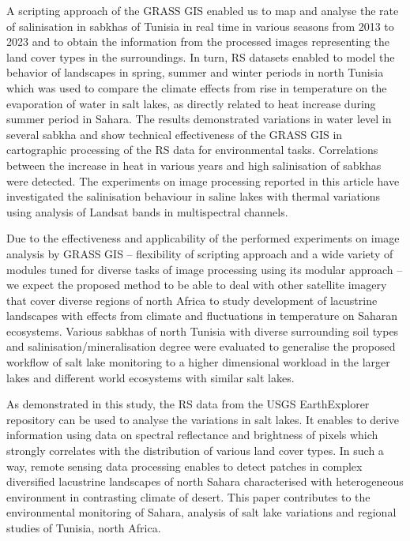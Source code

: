 \documentclass[environments,article,submit,pdftex,moreauthors]{Definitions/mdpi}
\begin{document}
A scripting approach of the GRASS GIS enabled us to map and analyse the rate of salinisation in sabkhas of Tunisia in real time in various seasons from 2013 to 2023 and to obtain the information from the processed images representing the land cover types in the surroundings. In turn, RS datasets enabled to model the behavior of landscapes in spring, summer and winter periods in north Tunisia which was used to compare the climate effects from rise in temperature on the evaporation of water in salt lakes, as directly related to heat increase during summer period in Sahara. The results demonstrated variations in water level in several sabkha and show technical effectiveness of the GRASS GIS in cartographic processing of the RS data for environmental tasks. Correlations between the increase in heat in various years and high salinisation of sabkhas were detected. The experiments on image processing reported in this article have investigated the salinisation behaviour in saline lakes with thermal variations using analysis of Landsat bands in multispectral channels. 

Due to the effectiveness and applicability of the performed experiments on image analysis by GRASS GIS -- flexibility of scripting approach and a wide variety of modules tuned for diverse tasks of image processing using its modular approach -- we expect the proposed method to be able to deal with other satellite imagery that cover diverse regions of north Africa to study development of lacustrine landscapes with effects from climate and fluctuations in temperature on Saharan ecosystems. Various sabkhas of north Tunisia with diverse surrounding soil types and salinisation/mineralisation degree were evaluated to generalise the proposed workflow of salt lake monitoring to a higher dimensional workload in the larger lakes and different world ecosystems with similar salt lakes. 

As demonstrated in this study, the RS data from the USGS EarthExplorer repository can be used to analyse the variations in salt lakes. It enables to derive information using data on spectral reflectance and brightness of pixels which strongly correlates with the distribution of various land cover types. In such a way, remote sensing data processing enables to detect patches in complex diversified lacustrine landscapes of north Sahara characterised with heterogeneous environment in contrasting climate of desert. This paper contributes to the environmental monitoring of Sahara, analysis of salt lake variations and regional studies of Tunisia, north Africa.
\end{document}
